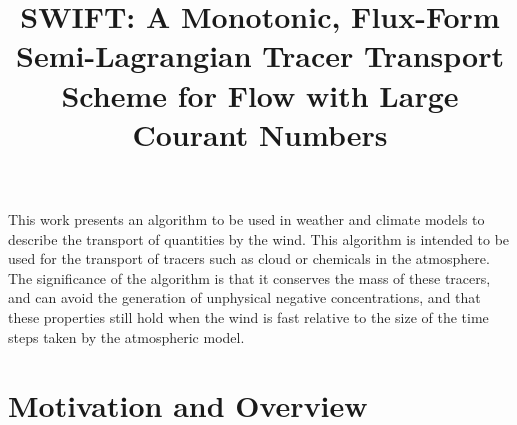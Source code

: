 \documentclass{ametsocV6.1}
\title{SWIFT: A Monotonic, Flux-Form Semi-Lagrangian Tracer Transport Scheme for Flow with Large Courant Numbers}
\affiliation{\aff{a}{Dynamics Research, Met Office, Exeter, UK}}
\begin{document}
\maketitle


\statement
This work presents an algorithm to be used in weather and climate models to describe the transport of quantities by the wind.
This algorithm is intended to be used for the transport of tracers such as cloud or chemicals in the atmosphere.
The significance of the algorithm is that it conserves the mass of these tracers, and can avoid the generation of unphysical negative concentrations, and that these properties still hold when the wind is fast relative to the size of the time steps taken by the atmospheric model.

%

%

\section{Motivation and Overview} \label{sec:intro}
\end{document}
